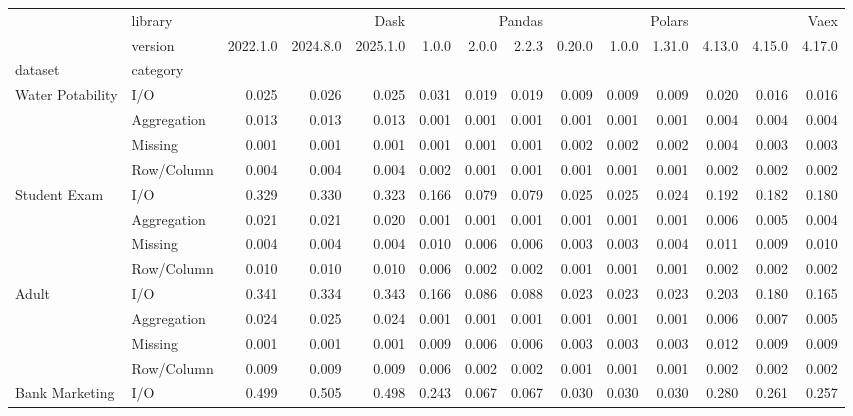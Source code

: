 \begin{tabular}{llrrrrrrrrrrrr}
\toprule
 & library & \multicolumn{3}{r}{Dask} & \multicolumn{3}{r}{Pandas} & \multicolumn{3}{r}{Polars} & \multicolumn{3}{r}{Vaex} \\
 & version & 2022.1.0 & 2024.8.0 & 2025.1.0 & 1.0.0 & 2.0.0 & 2.2.3 & 0.20.0 & 1.0.0 & 1.31.0 & 4.13.0 & 4.15.0 & 4.17.0 \\
dataset & category &  &  &  &  &  &  &  &  &  &  &  &  \\
\midrule
\multirow[t]{4}{*}{Water Potability} & I/O & 0.025 & 0.026 & 0.025 & 0.031 & 0.019 & 0.019 & 0.009 & 0.009 & 0.009 & 0.020 & 0.016 & 0.016 \\
 & Aggregation & 0.013 & 0.013 & 0.013 & 0.001 & 0.001 & 0.001 & 0.001 & 0.001 & 0.001 & 0.004 & 0.004 & 0.004 \\
 & Missing & 0.001 & 0.001 & 0.001 & 0.001 & 0.001 & 0.001 & 0.002 & 0.002 & 0.002 & 0.004 & 0.003 & 0.003 \\
 & Row/Column & 0.004 & 0.004 & 0.004 & 0.002 & 0.001 & 0.001 & 0.001 & 0.001 & 0.001 & 0.002 & 0.002 & 0.002 \\
\cline{1-14}
\multirow[t]{4}{*}{Student Exam} & I/O & 0.329 & 0.330 & 0.323 & 0.166 & 0.079 & 0.079 & 0.025 & 0.025 & 0.024 & 0.192 & 0.182 & 0.180 \\
 & Aggregation & 0.021 & 0.021 & 0.020 & 0.001 & 0.001 & 0.001 & 0.001 & 0.001 & 0.001 & 0.006 & 0.005 & 0.004 \\
 & Missing & 0.004 & 0.004 & 0.004 & 0.010 & 0.006 & 0.006 & 0.003 & 0.003 & 0.004 & 0.011 & 0.009 & 0.010 \\
 & Row/Column & 0.010 & 0.010 & 0.010 & 0.006 & 0.002 & 0.002 & 0.001 & 0.001 & 0.001 & 0.002 & 0.002 & 0.002 \\
\cline{1-14}
\multirow[t]{4}{*}{Adult} & I/O & 0.341 & 0.334 & 0.343 & 0.166 & 0.086 & 0.088 & 0.023 & 0.023 & 0.023 & 0.203 & 0.180 & 0.165 \\
 & Aggregation & 0.024 & 0.025 & 0.024 & 0.001 & 0.001 & 0.001 & 0.001 & 0.001 & 0.001 & 0.006 & 0.007 & 0.005 \\
 & Missing & 0.001 & 0.001 & 0.001 & 0.009 & 0.006 & 0.006 & 0.003 & 0.003 & 0.003 & 0.012 & 0.009 & 0.009 \\
 & Row/Column & 0.009 & 0.009 & 0.009 & 0.006 & 0.002 & 0.002 & 0.001 & 0.001 & 0.001 & 0.002 & 0.002 & 0.002 \\
\cline{1-14}
\multirow[t]{4}{*}{Bank Marketing} & I/O & 0.499 & 0.505 & 0.498 & 0.243 & 0.067 & 0.067 & 0.030 & 0.030 & 0.030 & 0.280 & 0.261 & 0.257 \\

\end{tabular}

